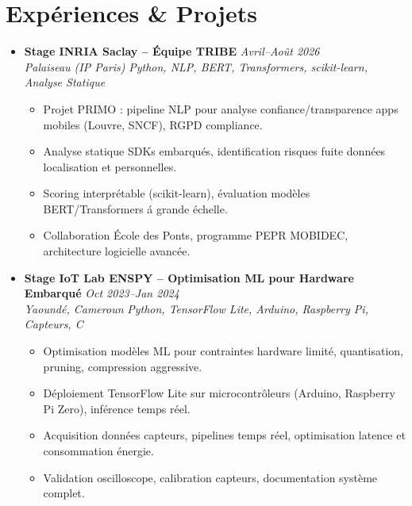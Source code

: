 \documentclass[a4paper,11pt]{article}
\begin{document}
\section{Exp\'eriences \& Projets}
\begin{itemize}[leftmargin=*, label={-}]
    \item \textbf{Stage INRIA Saclay -- \'Equipe TRIBE} \hfill \textit{Avril--Ao\^ut 2026} \\
    \textit{Palaiseau (IP Paris)} \hfill \textit{Python, NLP, BERT, Transformers, scikit-learn, Analyse Statique}
    \vspace{-2pt}
        \begin{itemize}[leftmargin=0.4cm, nosep, label=\tiny$\bullet$]
            \item \small{Projet PRIMO : pipeline NLP pour analyse confiance/transparence apps mobiles (Louvre, SNCF), RGPD compliance.}
            \item \small{Analyse statique SDKs embarqu\'es, identification risques fuite donn\'ees localisation et personnelles.}
            \item \small{Scoring interpr\'etable (scikit-learn), \'evaluation mod\`eles BERT/Transformers \'a grande \'echelle.}
            \item \small{Collaboration \'Ecole des Ponts, programme PEPR MOBIDEC, architecture logicielle avanc\'ee.}
        \end{itemize}
    \vspace{3pt}
    \item \textbf{Stage IoT Lab ENSPY -- Optimisation ML pour Hardware Embarqu\'e} \hfill \textit{Oct 2023--Jan 2024} \\
    \textit{Yaound\'e, Cameroun} \hfill \textit{Python, TensorFlow Lite, Arduino, Raspberry Pi, Capteurs, C}
    \vspace{-2pt}
        \begin{itemize}[leftmargin=0.4cm, nosep, label=\tiny$\bullet$]
            \item \small{Optimisation mod\`eles ML pour contraintes hardware limit\'e, quantisation, pruning, compression aggressive.}
            \item \small{D\'eploiement TensorFlow Lite sur microcontr\^oleurs (Arduino, Raspberry Pi Zero), inférence temps r\'eel.}
            \item \small{Acquisition donn\'ees capteurs, pipelines temps r\'eel, optimisation latence et consommation \'energie.}
            \item \small{Validation oscilloscope, calibration capteurs, documentation syst\`eme complet.}

\end{itemize}
\end{itemize}
\end{document}
